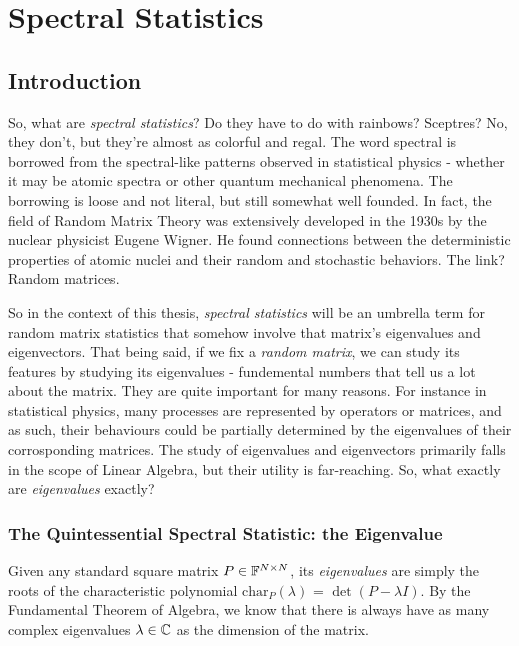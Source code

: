 
\chapter{Spectral Statistics}

\section{Introduction}
So, what are \textit{spectral statistics}? Do they have to do with rainbows? Sceptres? No, they don’t, but they’re almost as colorful and regal. The word spectral is borrowed from the spectral-like patterns observed in statistical physics - whether it may be atomic spectra or other quantum mechanical phenomena. The borrowing is loose and not literal, but still somewhat well founded. In fact, the field of Random Matrix Theory was extensively developed in the 1930s by the nuclear physicist Eugene Wigner. He found connections between the deterministic properties of atomic nuclei and their random and stochastic behaviors. The link? Random matrices.

So in the context of this thesis, \textit{spectral statistics} will be an umbrella term for random matrix statistics that somehow involve that matrix's eigenvalues and eigenvectors. That being said, if we fix a \textit{random matrix}, we can study its features by studying its eigenvalues - fundemental numbers that tell us a lot about the matrix. They are quite important for many reasons. For instance in statistical physics, many processes are represented by operators or matrices, and as such, their behaviours could be partially determined by the eigenvalues of their corrosponding matrices. The study of eigenvalues and eigenvectors primarily falls in the scope of Linear Algebra, but their utility is far-reaching. So, what exactly are \textit{eigenvalues} exactly?


\subsection{The Quintessential Spectral Statistic: the Eigenvalue}
Given any standard square matrix $P \in \mathbb{F}^{N \times N}$, its \textit{eigenvalues} are simply the roots of the characteristic polynomial $\text{char}_P{(\lambda)}$ = $\det(P - \lambda I)$. By the Fundamental Theorem of Algebra, we know that there is always have as many complex eigenvalues $\lambda \in \mathbb{C}$ as the dimension of the matrix. 

